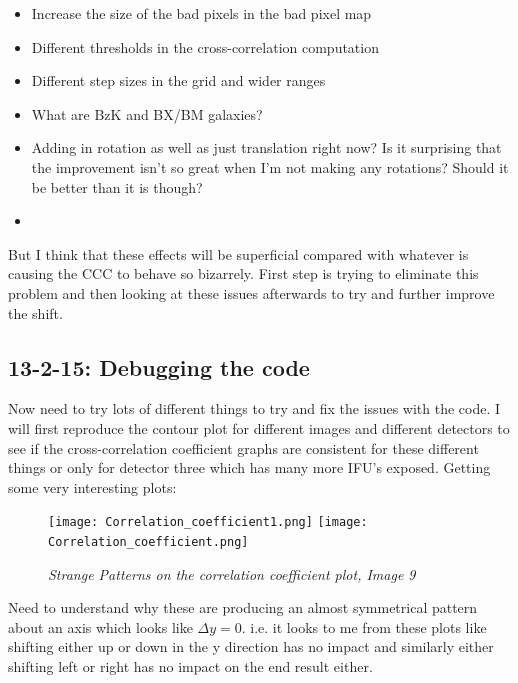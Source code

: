 \documentclass{literature}
\begin{document}
\begin{itemize}
 	\item Increase the size of the bad pixels in the bad pixel map 
 	\item Different thresholds in the cross-correlation computation 
 	\item Different step sizes in the grid and wider ranges 
 	\item What are BzK and BX/BM galaxies? 
 	\item Adding in rotation as well as just translation right now? Is it surprising that the improvement 
 	isn't so great when I'm not making any rotations? Should it be better than it is though? 
 	\item 
 \end{itemize} 

 But I think that these effects will be superficial compared with whatever is causing the CCC to behave so bizarrely. First step is trying to eliminate this problem and then looking at these issues afterwards to try and further improve the shift. 

 \subsection{13-2-15: Debugging the code}
Now need to try lots of different things to try and fix the issues with the code. I will first reproduce the contour plot for different images and different detectors to see if the cross-correlation coefficient graphs are consistent for these different things or only for detector three which has many more IFU's exposed. Getting some very interesting plots: 

\begin{figure}[!htp]
\centering
\texttt{[image: Correlation\_coefficient1.png]}
\texttt{[image: Correlation\_coefficient.png]}
\caption{\footnotesize{\emph{Strange Patterns on the correlation coefficient plot, Image 9}}}
\label{fig:rho_plot}
\end{figure} 

Need to understand why these are producing an almost symmetrical pattern about an axis which looks like $\Delta y = 0$. i.e. it looks to me from these plots like shifting either up or down in the y direction has no impact and similarly either shifting left or right has no impact on the end result either. 
\end{document}
